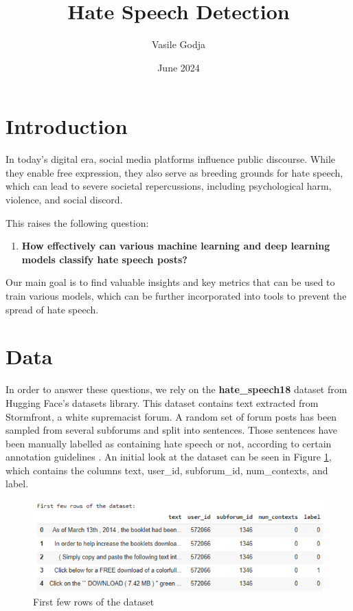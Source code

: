 \documentclass{article}
\title{Hate Speech Detection}
\author{Vasile Godja}
\date{June 2024}
\begin{document}
\maketitle

\section{Introduction}
In today’s digital era, social media platforms influence public discourse. While they enable free expression, they also serve as breeding grounds for hate speech, which can lead to severe societal repercussions, including psychological harm, violence, and social discord. 

This raises the following question:
\begin{enumerate}
    \item \textbf{How effectively can various machine learning and deep learning models classify hate speech posts?}
\end{enumerate}

Our main goal is to find valuable insights and key metrics that can be used to train various models, which can be further incorporated into tools to prevent the spread of hate speech.
\section*{Data}

In order to answer these questions, we rely on the \textbf{hate\_speech18} dataset from Hugging Face's datasets library. This dataset contains text extracted from Stormfront, a white supremacist forum. A random set of forum posts has been sampled from several subforums and split into sentences. Those sentences have been manually labelled as containing hate speech or not, according to certain annotation guidelines \cite{gibert2018hate}.
An initial look at the dataset can be seen in Figure \ref{fig:first_rows}, which contains the columns text, user\_id, subforum\_id, num\_contexts, and label.

\begin{figure}[H]
    \centering
    \includegraphics[width=\linewidth]{figure1.png}
    \caption{First few rows of the dataset}
    \label{fig:first_rows}
\end{figure}
\end{document}
